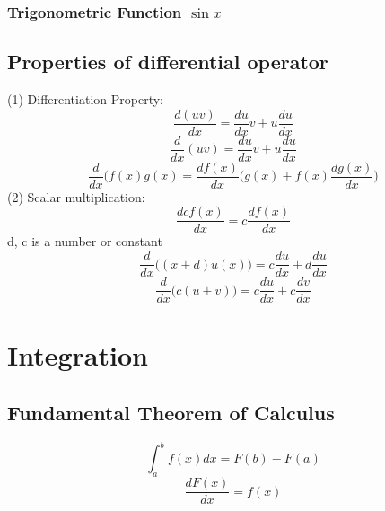 		\subsubsection{Trigonometric Function $\sin x$}
		
		
		
		
		
		
	\subsection{Properties of differential operator}
	(1) Differentiation Property:
	\begin{equation}
		\frac{d(uv)}{dx} = \frac{du}{dx}v+u\frac{du}{dx}
	\end{equation}
	\begin{equation}
		\frac{d}{dx}(uv)=\frac{du}{dx}v+u\frac{du}{dx}
	\end{equation}
	\begin{equation}
		\frac{d}{dx}(f(x)g(x)=\frac{df(x)}{dx}\bigg(g(x)+f(x)\frac{dg(x)}{dx}\bigg)
	\end{equation}
	\newline
	(2) Scalar multiplication:
	\begin{equation}
		\frac{dcf(x)}{dx} = c\frac{df(x)}{dx}
	\end{equation}
		d, c is a number or constant
	\begin{equation}
		\frac{d}{dx}\Big((x+d)u(x)\Big)=c\frac{du}{dx}+d\frac{du}{dx}
	\end{equation}
	\begin{equation}
		\frac{d}{dx}\Big(c(u+v)\Big) = c\frac{du}{dx} + c\frac{dv}{dx}
	\end{equation}







\section{Integration}



\subsection{Fundamental Theorem of Calculus}

\begin{equation}
	\int_{a}^{b}f(x)dx=F(b)-F(a)
\end{equation}
\begin{equation}
	\frac{dF(x)}{dx}=f(x)
\end{equation}

